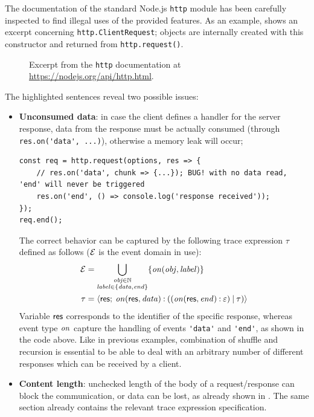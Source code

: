 The documentation of the standard Node.js \lstinline{http} module has been carefully inspected to find illegal uses
of the provided features.
As an example,  shows an excerpt concerning \lstinline{http.ClientRequest};
objects are internally created with this constructor and returned from \lstinline{http.request()}.
\begin{figure}
	\caption{Excerpt from the \lstinline{http} documentation at \url{https://nodejs.org/api/http.html}.}
	\label{fig:httpDoc}
\end{figure}
The highlighted sentences reveal two possible issues:
\begin{itemize}
	\item \textbf{Unconsumed data}: in case the client defines a handler for the server response, data from the response must be actually consumed (through \lstinline|res.on('data', ...)|), otherwise a memory leak will occur;
	\begin{lstlisting}[belowskip=-3em]
const req = http.request(options, res => {
	// res.on('data', chunk => {...}); BUG! with no data read, 'end' will never be triggered
	res.on('end', () => console.log('response received'));
});
req.end();
	\end{lstlisting}
	The correct behavior can be captured by the following trace expression $\tau$ defined as follows (\(\mathcal{E}\) is the event domain in use):
	\begin{align*}
		\mathcal{E} &= \bigcup_{
				\substack{
					\mathit{obj} \in \mathbb{N}\\
					\mathit{label} \in \{ \mathit{data}, \mathit{end} \}
				}
			}
			\{ \mathit{on}(\mathit{obj}, \mathit{label}) \} \\
		\tau &= {\langle}\mathsf{res};\:{\mathit{on}(\mathsf{res}, \mathit{data}) \mathbin{:} ((\mathit{on}(\mathsf{res}, \mathit{end}) \mathbin{:} \varepsilon) \mathbin{|} \tau)}{\rangle}
	\end{align*}
	Variable \(\mathsf{res}\) corresponds to the identifier of the specific response, whereas event type \(\mathit{on}\) capture the handling of events \lstinline{'data'} and \lstinline{'end'}, as shown in the code above.
	Like in previous examples, combination of shuffle and recursion is essential to be able to deal with an arbitrary number of different responses which can be received by a client.
	\item \textbf{Content length}: unchecked length of the body of a request/response can block the communication, or data can be lost, as already shown in .
	The same section already contains the relevant trace expression specification.
\end{itemize}

